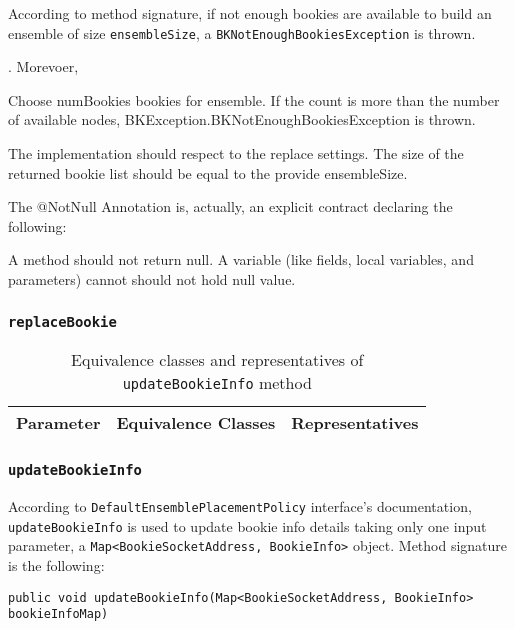 \documentclass[sigconf]{acmart}
\newcommand{\AndreaTable}[3]{\begin{table*}[h!]
\caption{#1}
\centering
\begin{tabular}{#2}
\toprule
#3
\bottomrule
\end{tabular}
\end{table*}
}
\newcommand{\equivalenceClassesTable}[2]{
\AndreaTable{#1}{llm{8cm}m{8cm}}{#2}
}
\begin{document}
 According to method signature, if  not enough bookies are available to build an ensemble of size \texttt{ensembleSize}, a \texttt{BKNotEnoughBookiesException} is thrown.

. Morevoer, 

Choose numBookies bookies for ensemble. If the count is more than the number of available nodes, BKException.BKNotEnoughBookiesException is thrown.

The implementation should respect to the replace settings. The size of the returned bookie list should be equal to the provide ensembleSize. 


The @NotNull Annotation is, actually, an explicit contract declaring the following:

A method should not return null.
A variable (like fields, local variables, and parameters) cannot should not hold null value.






\subsubsection{\texttt{replaceBookie}}

\equivalenceClassesTable{Equivalence classes and representatives of \texttt{updateBookieInfo} method}{
  
    \textbf{Parameter} & \multicolumn{2}{|l|}{\textbf{Equivalence Classes}} & \textbf{Representatives} \\
    \midrule
    


}


\subsubsection{\texttt{updateBookieInfo}}

According to \texttt{DefaultEnsemblePlacementPolicy} interface's documentation\cite{EnsemblePlacementPolicy}, \texttt{updateBookieInfo} is used to update bookie info details taking only one input parameter, a \texttt{Map<BookieSocketAddress, BookieInfo>} object. 
Method signature is the following:

\begin{lstlisting}[frame=lines,caption={\texttt{onClusterChanged} method signature.}]
public void updateBookieInfo(Map<BookieSocketAddress, BookieInfo> bookieInfoMap)
\end{lstlisting}
\end{document}
